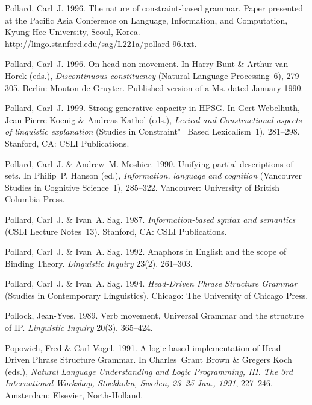 \begin{thebibliography}{1420}
Pollard, Carl~J. 1996{}.
\newblock The nature of constraint-based grammar.
\newblock Paper presented at the {Pacific Asia Conference on Language,
  Information, and Computation, Kyung Hee University, Seoul, Korea}.
\newblock \urlprefix\url{http://lingo.stanford.edu/sag/L221a/pollard-96.txt}.

Pollard, Carl~J. 1996{}.
\newblock On head non-movement.
\newblock In Harry Bunt \& Arthur van Horck (eds.), \emph{Discontinuous
  constituency} (Natural Language Processing~6), 279--305. Berlin: Mouton de
  Gruyter.
\newblock Published version of a Ms. dated January 1990.

Pollard, Carl~J. 1999.
\newblock Strong generative capacity in {HPSG}.
\newblock In Gert Webelhuth, Jean-Pierre Koenig \& Andreas Kathol (eds.),
  \emph{Lexical and {Constructional} aspects of linguistic explanation}
  (Studies in Constraint"=Based Lexicalism~1), 281--298. Stanford, CA: CSLI
  Publications.

Pollard, Carl~J. \& Andrew~M. Moshier. 1990.
\newblock Unifying partial descriptions of sets.
\newblock In Philip~P. Hanson (ed.), \emph{Information, language and cognition}
  (Vancouver Studies in Cognitive Science~1), 285--322. Vancouver: University
  of British Columbia Press.

Pollard, Carl~J. \& Ivan~A. Sag. 1987.
\newblock \emph{Information-based syntax and semantics} (CSLI Lecture
  Notes~13).
\newblock Stanford, CA: CSLI Publications.

Pollard, Carl~J. \& Ivan~A. Sag. 1992.
\newblock Anaphors in {English} and the scope of {Binding Theory}.
\newblock \emph{Linguistic Inquiry} 23(2). 261--303.

Pollard, Carl~J. \& Ivan~A. Sag. 1994.
\newblock \emph{{Head-Driven Phrase Structure Grammar}}  (Studies in
  Contemporary Linguistics).
\newblock Chicago: The University of Chicago Press.

Pollock, Jean-Yves. 1989.
\newblock Verb movement, {Universal Grammar} and the structure of {IP}.
\newblock \emph{Linguistic Inquiry} 20(3). 365--424.

Popowich, Fred \& Carl Vogel. 1991.
\newblock A logic based implementation of {Head-Driven Phrase Structure
  Grammar}.
\newblock In Charles~Grant Brown \& Gregers Koch (eds.), \emph{{Natural
  Language Understanding and Logic Programming, III. The 3rd International
  Workshop, Stockholm, Sweden, 23--25 Jan., 1991}}, 227--246. Amsterdam:
  Elsevier, North-Holland.


\end{thebibliography}
